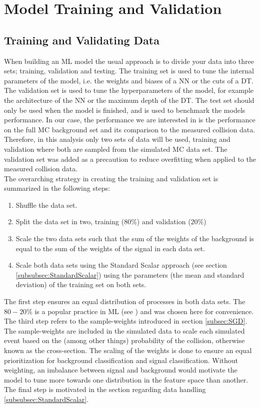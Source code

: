 \newpage
\section{Model Training and Validation}
\subsection{Training and Validating Data}\label{subsec:TraVal}
When building an \ac{ML} model the usual approach is to divide your data into three sets; training, validation and 
testing. The training set is used to tune the internal parameters of the model, i.e. the weights and biases of a \ac{NN} or the cuts of a \ac{DT}.
The validation set is used to tune the hyperparameters of the model, for example the architecture of the \ac{NN} or the maximum depth of the \ac{DT}.
The test set should only be used when the model is finished, and is used to benchmark the models performance. In our case, the performance we are 
interested in is the performance on the full \ac{MC} background set and its comparison to the measured collision data. 
Therefore, in this analysis only two sets of data will be used, training and validation where both are sampled from the simulated
\ac{MC} data set. The validation set was added as a precaution to reduce overfitting when applied to the measured collision data.
\\
The overarching strategy in creating the training and validation set is summarized in the following steps:
\begin{enumerate}
    \item Shuffle the data set. 
    \item Split the data set in two, training ($80\%$) and validation ($20\%$)
    \item Scale the two data sets such that the sum of the weights of the background is equal to the sum of the weights of the signal in each data set.
    \item Scale both data sets using the Standard Scalar approach (see section \ref{subsubsec:StandardScalar}) using the parameters (the mean and standard deviation) 
    of the training set on both sets.
\end{enumerate}
The first step ensures an equal distribution of processes in both data sets. The $80-20\%$ is a popular practice in \ac{ML} (see \cite{8020}) and was chosen 
here for convenience. The third step refers to the sample-weights introduced in section \ref{subsec:SGD}. The sample-weights are included in the simulated data
to scale each simulated event based on the (among other things) probability of the collision, otherwise known as the cross-section. The scaling of the 
weights is done to ensure an equal prioritization for background classification and signal classification. Without weighting, an imbalance between signal and background 
would motivate the model to tune more towards one distribution in the feature space than another. The final step is motivated in the section regarding data handling \ref{subsubsec:StandardScalar}. 


